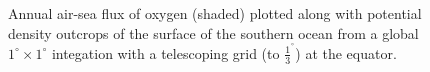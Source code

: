\begin{figure}
\caption{Annual air-sea flux of oxygen (shaded) plotted along with
potential density outcrops of the surface of the southern ocean from a
global $1^{\circ}\times 1^{\circ}$ integation with a telescoping
grid (to $\frac{1}{3}^{^\circ}$) at the equator.}
\label{fig:biogeo}
\end{figure}
